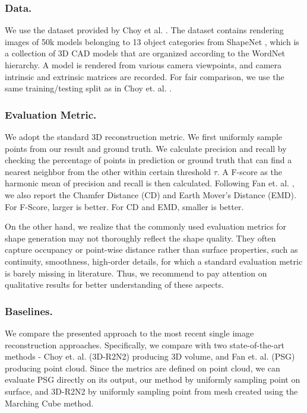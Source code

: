 \documentclass[runningheads]{llncs}
\begin{document}
\subsubsection{Data.}
We use the dataset provided by Choy et al. \cite{ChoyXGCS16}. The dataset contains rendering images of 50k models belonging to 13 object categories from ShapeNet \cite{ChangFGHHLSSSSX15}, which is a collection of 3D CAD models that are organized according to the WordNet hierarchy.
A model is rendered from various camera viewpoints, and camera intrinsic and extrinsic matrices are recorded.
For fair comparison, we use the same training/testing split as in Choy et. al. \cite{ChoyXGCS16}.



\subsubsection{Evaluation Metric.} 
We adopt the standard 3D reconstruction metric.
We first uniformly sample points from our result and ground truth. We calculate precision and recall by checking the percentage of points in prediction or ground truth that can find a nearest neighbor from the other within certain threshold $\tau$. A F-score \cite{KnapitschPZK17} as the harmonic mean of precision and recall is then calculated.
Following Fan et. al. \cite{FanSG16}, we also report the Chamfer Distance (CD) and Earth Mover's Distance (EMD). For F-Score, larger is better. For CD and EMD, smaller is better.

On the other hand, we realize that the commonly used evaluation metrics for shape generation may not thoroughly reflect the shape quality. They often capture occupancy or point-wise distance rather than surface properties, such as continuity, smoothness, high-order details, for which a standard evaluation metric is barely missing in literature. Thus, we recommend to pay attention on qualitative results for better understanding of these aspects.

\subsubsection{Baselines.} We compare the presented approach to the most recent single image reconstruction approaches. Specifically, we compare with two state-of-the-art methods - Choy et. al. \cite{ChoyXGCS16} (3D-R2N2) producing 3D volume, and Fan et. al. \cite{FanSG16} (PSG) producing point cloud.
Since the metrics are defined on point cloud, we can evaluate PSG directly on its output, our method by uniformly sampling point on surface, and 3D-R2N2 by uniformly sampling point from mesh created using the Marching Cube \cite{LorensenC87} method.
\end{document}
